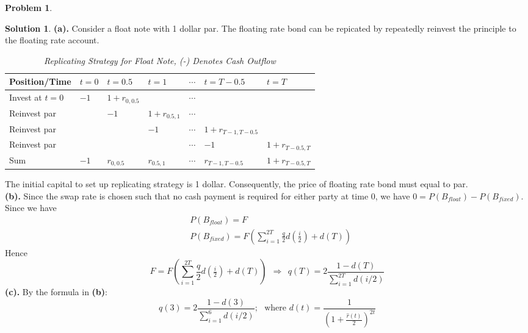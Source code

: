 \documentclass[a4paper, 10pt]{article}
\renewcommand{\arraystretch}{1.3}
\theoremstyle{definition}
\newtheorem{problem}{Problem}
\theoremstyle{hSol}
\newtheorem*{solution}{Solution}
\begin{document}
\begin{problem} 
\end{problem}
\begin{solution} \textbf{(a).} Consider a float note with 1 dollar par. The floating rate bond can be repicated by repeatedly reinvest the principle to the floating rate account.
  \begin{table}[H]
  \scriptsize
  \vspace{-10pt}
  \caption{\textit{Replicating Strategy for Float Note, (-) Denotes Cash Outflow}}
  \vspace{3pt}
  \centering
  \def\arraystretch{2}
  \begin{tabular}{|m{2cm}|m{1.6cm}|m{1.6cm}|m{1.6cm}|m{1.6cm}|m{2cm}|m{2cm}|}
  \hline
  Position/Time &$t=0$ & $t=0.5$ & $t=1$ & $\cdots$&$t=T-0.5$ & $t=T$\\ 
  \hline
  Invest at $t=0$ &$-1$ & $1+r_{0, 0.5}$ & & $\cdots$ &  & \\ 
  Reinvest par & & $-1$ & $1+r_{0.5, 1}$ & $\cdots$&  & \\ 
  Reinvest par & &  & $-1$ & $\cdots$& $1+r_{T-1, T-0.5}$ & \\ 
  Reinvest par & &  &  & $\cdots$& $-1$ & $1+r_{T-0.5, T}$\\ 
  \hline
  Sum & $-1$ & $r_{0,0.5}$& $r_{0.5, 1}$& $\cdots$& $r_{T-1, T-0.5}$& $1+r_{T-0.5, T}$\\
  \hline
  \end{tabular}
  \label{tab:rep1}
  \end{table}
The initial capital to set up replicating strategy is 1 dollar. Consequently, the price of floating rate bond must equal to par. \\
\textbf{(b).} Since the swap rate is chosen such that no cash payment is required for either party at time $0$, we have $0 = P(B_{float}) - P(B_{fixed})$. Since we have
\begin{equation}
  \begin{split}
    &P(B_{float}) = F \\
    &P(B_{fixed}) = F\left(\sum_{i=1}^{2T} \frac{q}{2} d(\tfrac{i}{2}) +d(T)\right)
  \end{split}
\end{equation}
Hence
\begin{equation}
  F = F\left(\sum_{i=1}^{2T} \frac{q}{2} d(\tfrac{i}{2}) + d(T)\right)~~\Rightarrow~~ q(T) = 2\frac{1 - d(T)}{\sum_{i=1}^{2T} d(i/2)}
\end{equation}
\textbf{(c).} By the formula in \textbf{(b)}:
$$
q(3) = 2\frac{1 - d(3)}{\sum_{i=1}^{6}  d(i/2)};~~~\text{where }d(t) = \frac{1}{\left(1+\frac{\hat{r}(t)}{2}\right)^{2t}}
$$
\end{solution}
\end{document}
